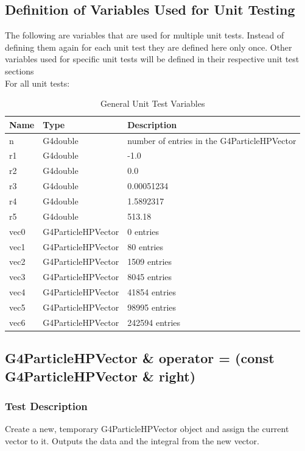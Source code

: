 \documentclass[12pt]{article}
\begin{document}
\subsection{Definition of Variables Used for Unit Testing}
The following are variables that are used for multiple unit tests. Instead of defining them again for each unit test they are defined here only once. Other variables used for specific unit tests will be defined in their respective unit test sections\\
For all unit tests:
\begin{table}[H]
\centering
\caption{General Unit Test Variables}\label{gen_var_table}
\begin{tabular}{lll}
\toprule
	\bf Name & \bf Type & \bf Description\\\midrule
	n 	& G4double 			& number of entries in the G4ParticleHPVector\\
	r1 	& G4double 			& -1.0\\
	r2	& G4double			& 0.0\\
	r3 	& G4double 			& 0.00051234\\
	r4 	& G4double 			& 1.5892317\\
	r5 	& G4double 			& 513.18\\
	vec0 & G4ParticleHPVector 	& 0 entries\\
	vec1 & G4ParticleHPVector	& 80 entries\\
	vec2 & G4ParticleHPVector 	& 1509 entries\\
	vec3 & G4ParticleHPVector 	& 8045 entries\\
	vec4 & G4ParticleHPVector 	& 41854 entries\\
	vec5 & G4ParticleHPVector 	& 98995 entries\\
	vec6 & G4ParticleHPVector 	& 242594 entries\\
\bottomrule		
\end{tabular}
\end{table}

\subsection{G4ParticleHPVector \& operator = (const G4ParticleHPVector \& right)}
	\subsubsection{Test Description}
	Create a new, temporary G4ParticleHPVector object and assign the current vector to it. Outputs the data and the integral from the new vector.
\end{document}
